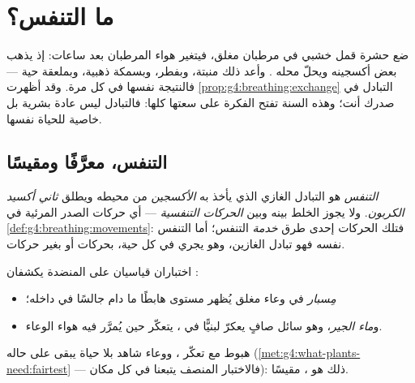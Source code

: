 \chapter{ما التنفس؟}\label{ch:g7:what-is-respiration}

ضع حشرة قمل خشبي في مرطبان مغلق، فيتغير هواء المرطبان بعد ساعات:
إذ يذهب بعض أكسجينه ويحلّ محله . وأعد ذلك 
منبتة، وبفطر، وبسمكة ذهبية، وبملعقة  حية --- فالنتيجة نفسها
في كل مرة. وقد أظهرت \cref{prop:g4:breathing:exchange} التبادل في
صدرك أنت؛ وهذه السنة تفتح الفكرة على سعتها كلها: فالتبادل ليس عادة
بشرية بل خاصية للحياة نفسها.

\section{التنفس، معرَّفًا ومقيسًا}

\begin{definition}[التنفس]\label{def:g7:what-is-respiration:respiration}
\emph{التنفس} هو التبادل الغازي الذي يأخذ به  \emph{الأكسجين} من محيطه ويطلق
\emph{ثاني أكسيد الكربون}. ولا يجوز
الخلط بينه وبين \emph{الحركات التنفسية} ---
أي حركات الصدر المرئية في \cref{def:g4:breathing:movements}:
فتلك الحركات إحدى طرق \emph{خدمة} التنفس؛ أما التنفس نفسه فهو
تبادل الغازين، وهو يجري في كل  حية، بحركات أو بغير حركات.
\end{definition}

\begin{proposition}\label{prop:g7:what-is-respiration:shown}
اختباران قياسيان على المنضدة يكشفان :
\begin{itemize}
  \item \emph{مِسبار } في وعاء مغلق يُظهر مستوى 
        هابطًا ما دام  جالسًا في داخله؛
  \item و\emph{ماء الجير}، وهو سائل صافٍ يعكرّ
        لبنيًّا في ، يتعكّر حين يُمرَّر فيه هواء
        الوعاء.
\end{itemize}
هبوط  مع تعكّر ، ووعاء شاهد بلا حياة يبقى على
حاله (\cref{met:g4:what-plants-need:fairtest} --- فالاختبار المنصف
يتبعنا في كل مكان): ذلك هو ، مقيسًا.
\end{proposition}
\admitted

